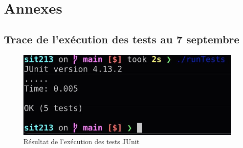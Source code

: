 \section*{Annexes}

\subsection{Trace de l'exécution des tests au 7 septembre}
\begin{figure}[H]
    \centering
    \includegraphics[width=\textwidth]{img/runTests.jpg}
    \caption{Résultat de l'exécution des tests JUnit}
    \label{fig:tests1}
\end{figure}
